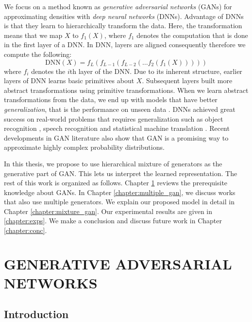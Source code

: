 \documentclass[a4paper,onesided,12pt]{report}
\begin{document}
We focus on a method known as \emph{generative adversarial networks} (GANs) \cite{goodfellow2014generative} for approximating densities with \emph{deep neural networks} (DNNs). Advantage of DNNs is that they learn to hierarchically transform the data. Here, the transformation means that we map $X$ to $f_1(X)$, where $f_1$ denotes the computation that is done in the first layer of a DNN. In DNN, layers are aligned consequently therefore we compute the following:
\begin{equation}
\text{DNN}(X) = f_L (f_{L-1} (f_{L-2} ( \dots f_2( f_1(X) ) ) ) )
\label{eq:dnn}
\end{equation}
where $f_i$ denotes the $i$th layer of the DNN. Due to its inherent structure, earlier layers of DNN learns basic primitives about $X$. Subsequent layers built more abstract transformations using primitive transformations. When we learn abstract transformations from the data, we end up with models that have better \emph{generalization}, that is the performance on unseen data \cite{bengio2009learning}. DNNs achieved great success on real-world problems that requires generalization such as object recognition \cite{krizhevsky2012imagenet}, speech recognition \cite{hinton2012deep} and statistical machine translation \cite{sutskever2014sequence}. Recent developments in GAN literature also show that GAN is a promising way to approximate highly complex probability distributions.

In this thesis, we propose to use hierarchical mixture of generators as the generative part of GAN. This lets us interpret the learned representation. The rest of this work is organized as follows. Chapter \ref{chapter:gan} reviews the prerequisite knowledge about GANs. In Chapter \ref{chapter:multiple_gan}, we discuss works that also use multiple generators. We explain our proposed model in detail in Chapter \ref{chapter:mixture_gan}. Our experimental results are given in \ref{chapter:exps}. We make a conclusion and discuss future work in Chapter \ref{chapter:conc}.

\chapter{GENERATIVE ADVERSARIAL NETWORKS}
\label{chapter:gan}

\section{Introduction}
\label{sec:gan:intro}
\end{document}
